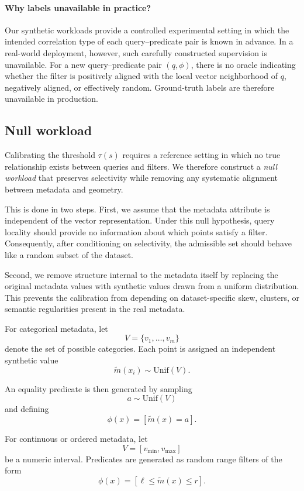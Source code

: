 \paragraph{Why labels unavailable in practice?}

Our synthetic workloads provide a controlled experimental setting in which the intended correlation type of each query--predicate pair is known in advance. 
In a real-world deployment, however, such carefully constructed supervision is unavailable. For a new query--predicate pair \((q,\phi)\), there is no oracle indicating whether the filter is positively aligned with the local vector neighborhood of \(q\), negatively aligned, or effectively random. Ground-truth labels are therefore unavailable in production.

\subsection{Null workload}

Calibrating the threshold \(\tau(s)\) requires a reference setting in which no true relationship exists between queries and filters. We therefore construct a \emph{null workload} that preserves selectivity while removing any systematic alignment between metadata and geometry.

This is done in two steps. First, we assume that the metadata attribute is independent of the vector representation. Under this null hypothesis, query locality should provide no information about which points satisfy a filter. Consequently, after conditioning on selectivity, the admissible set should behave like a random subset of the dataset.

Second, we remove structure internal to the metadata itself by replacing the original metadata values with synthetic values drawn from a uniform distribution. This prevents the calibration from depending on dataset-specific skew, clusters, or semantic regularities present in the real metadata.

For categorical metadata, let
\[
V=\{v_1,\dots,v_m\}
\]
denote the set of possible categories. Each point is assigned an independent synthetic value
\[
\tilde m(x_i)\sim \mathrm{Unif}(V).
\]

An equality predicate is then generated by sampling
\[
a\sim \mathrm{Unif}(V)
\]
and defining
\[
\phi(x)=[\tilde m(x)=a].
\]

For continuous or ordered metadata, let
\[
V=[v_{\min},v_{\max}]
\]
be a numeric interval. Predicates are generated as random range filters of the form
\[
\phi(x)=[\ell \leq \tilde m(x)\leq r].
\]


